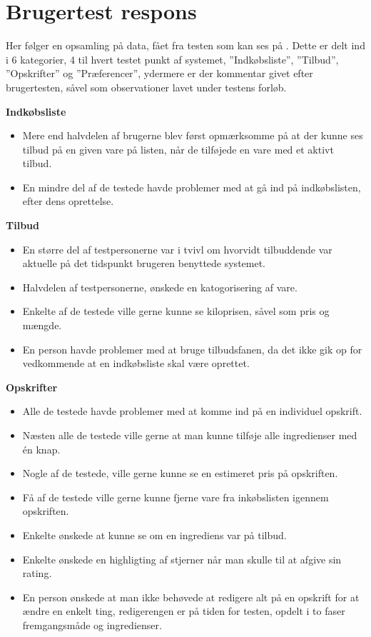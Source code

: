 \chapter{Brugertest respons}\label{b:brugertestrespons}
Her følger en opsamling på data, fået fra testen som kan ses på .
Dette er delt ind i 6 kategorier, 4 til hvert testet punkt af systemet, ''Indkøbsliste'', ''Tilbud'', ''Opskrifter'' og ''Præferencer'', ydermere er der kommentar givet efter brugertesten, såvel som observationer lavet under testens forløb.

\textbf{Indkøbsliste} 
\begin{itemize}
   \item Mere end halvdelen af brugerne blev først opmærksomme på at der kunne ses tilbud på en given vare på listen, når de tilføjede en vare med et aktivt tilbud.
   \item En mindre del af de testede havde problemer med at gå ind på indkøbslisten, efter dens oprettelse.
\end{itemize}

\textbf{Tilbud} 
\begin{itemize}
   \item En større del af testpersonerne var i tvivl om hvorvidt tilbuddende var aktuelle på det tidspunkt brugeren benyttede systemet.
   \item Halvdelen af testpersonerne, ønskede en katogorisering af vare.
   \item Enkelte af de testede ville gerne kunne se kiloprisen, såvel som pris og mængde.
   \item En person havde problemer med at bruge tilbudsfanen, da det ikke gik op for vedkommende at en indkøbsliste skal være oprettet.
\end{itemize}

\textbf{Opskrifter} 
\begin{itemize}
   \item Alle de testede havde problemer med at komme ind på en individuel opskrift.
   \item Næsten alle de testede ville gerne at man kunne tilføje alle ingredienser med én knap.
   \item Nogle af de testede, ville gerne kunne se en estimeret pris på opskriften.
   \item Få af de testede ville gerne kunne fjerne vare fra inkøbslisten igennem opskriften.
   \item Enkelte ønskede at kunne se om en ingrediens var på tilbud.
   \item Enkelte ønskede en highligting af stjerner når man skulle til at afgive sin rating.
   \item En person ønskede at man ikke behøvede at redigere alt på en opskrift for at ændre en enkelt ting, redigerengen er på tiden for testen, opdelt i to faser fremgangsmåde og ingredienser.
\end{itemize}

